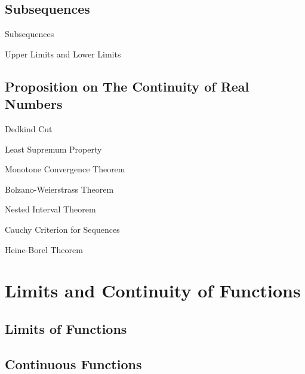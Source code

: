 \documentclass[11pt]{elegantbook}
\begin{document}
\section{Subsequences}
\begin{leftbarTitle}{Subsequences}\end{leftbarTitle}

\begin{leftbarTitle}{Upper Limits and Lower Limits}\end{leftbarTitle}


\section{Proposition on The Continuity of Real Numbers}
\begin{leftbarTitle}{Dedkind Cut}\end{leftbarTitle}

\begin{leftbarTitle}{Least Supremum Property}\end{leftbarTitle}

\begin{leftbarTitle}{Monotone Convergence Theorem}\end{leftbarTitle}

\begin{leftbarTitle}{Bolzano-Weierstrass Theorem}\end{leftbarTitle}

\begin{leftbarTitle}{Nested Interval Theorem}\end{leftbarTitle}

\begin{leftbarTitle}{Cauchy Criterion for Sequences}\end{leftbarTitle}

\begin{leftbarTitle}{Heine-Borel Theorem}\end{leftbarTitle}





\chapter{Limits and Continuity of Functions}
\section{Limits of Functions}

\section{Continuous Functions}
\end{document}
